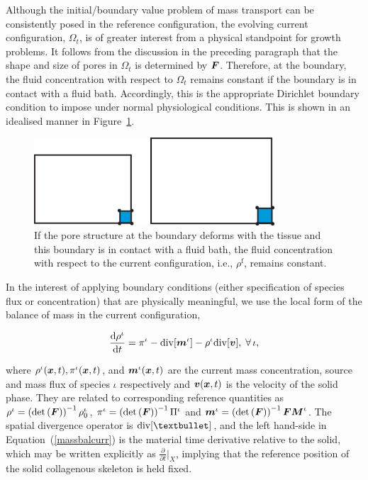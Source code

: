 Although the initial/boundary value problem of mass transport can be
consistently posed in the reference configuration, the evolving
current configuration, $\Omega_t$, is of greater interest from a
physical standpoint for growth problems. It follows from the
discussion in the preceding paragraph that the shape and size of
pores in $\Omega_t$ is determined by $\mbox{\boldmath$ F$}$. Therefore, at
the boundary, the fluid concentration with 
respect to $\Omega_t$ remains constant if the boundary is in contact
with a fluid bath.  Accordingly, this is the appropriate Dirichlet
boundary condition to impose under normal physiological
conditions. This is shown in an idealised manner in Figure~\ref{fbc}.

\begin{figure}
\centering
\includegraphics[width=0.8\textwidth]{images/elucidation/concentration}
\caption{If the pore structure at the boundary deforms with the
tissue and this boundary is in contact with a fluid bath, the
fluid concentration with respect to the current configuration,
i.e., $\rho^\mathrm{f}$, remains constant.}\label{fbc}
\end{figure}

In the interest of applying boundary conditions (either specification
of species flux or concentration) that are physically meaningful, we
use the local form of the balance of mass in the current
configuration,

\begin{equation}
\frac{\mathrm{d}\rho^\iota}{\mathrm{d}t} = \pi^\iota-
\mathrm{div}[\mbox{\boldmath$ m$}^\iota] - \rho^\iota
\mathrm{div}[\mbox{\boldmath$ v$}],\;\forall\,\iota, \label{massbalcurr}
\end{equation}

\noindent where $\rho^\iota(\mbox{\boldmath$ x$},t),\pi^\iota(\mbox{\boldmath$ x$},t)$, and
$\mbox{\boldmath$ m$}^\iota(\mbox{\boldmath$ x$},t)$ are the current mass concentration, source and mass
flux of species $\iota$ respectively and $\mbox{\boldmath$ v$}(\mbox{\boldmath$ x$},t)$ is the velocity
of the solid phase. They are related to corresponding reference
quantities as $\rho^\iota = \left(\mathrm{det} \left(\mbox{\boldmath$ F$}\right)
\right)^{-1} \rho_0^\iota$, $\pi^\iota = \left(\mathrm{det}
\left(\mbox{\boldmath$ F$}\right) \right)^{-1} \Pi^\iota$ and $\mbox{\boldmath$ m$}^\iota =
\left(\mathrm{det} \left(\mbox{\boldmath$ F$}\right) \right)^{-1} \mbox{\boldmath$ F$} \mbox{\boldmath$ M$}^\iota$. The
spatial divergence operator is $\mathrm{div}[\textbullet]$, and
the left hand-side in Equation~(\ref{massbalcurr}) is the material
time derivative relative to the solid, which may be written explicitly as
$\frac{\partial}{\partial t}\vert_X$, implying that the reference
position of the solid collagenous skeleton is held fixed.

